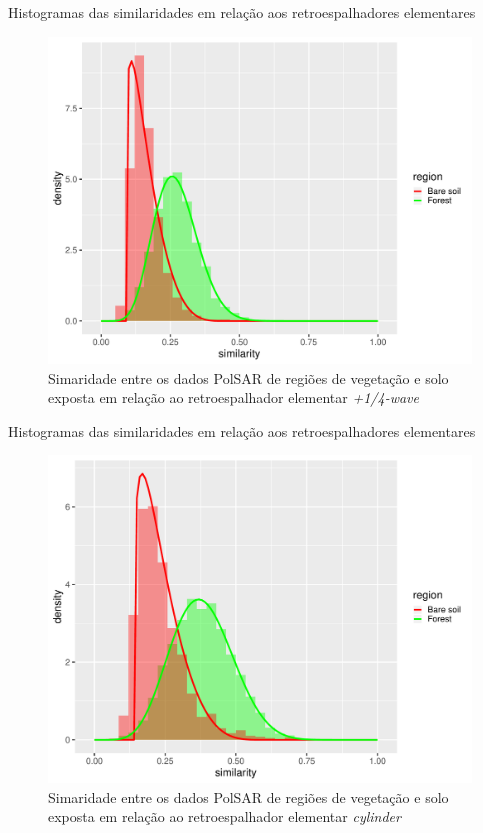 \documentclass{beamer} %
\begin{document}
\begin{frame}{Histogramas das similaridades em relação aos retroespalhadores elementares}

\begin{figure}
    \centering
    \includegraphics[width = .6\linewidth]{wvp.pdf}
    \caption{Simaridade entre os dados PolSAR de regiões de vegetação e solo exposta em relação ao retroespalhador elementar \textit{+1/4-wave}}
    \label{fig:wvp}
\end{figure}
    
\end{frame}

\begin{frame}{Histogramas das similaridades em relação aos retroespalhadores elementares}

\begin{figure}
    \centering
    \includegraphics[width = .6\linewidth]{cy.pdf}
    \caption{Simaridade entre os dados PolSAR de regiões de vegetação e solo exposta em relação ao retroespalhador elementar \textit{cylinder}}
    \label{fig:cy}
\end{figure}
    
\end{frame}
\end{document}
